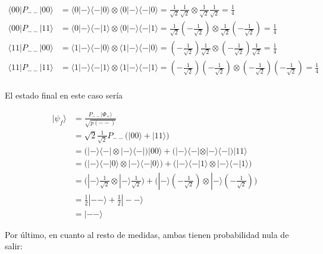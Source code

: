 \documentclass{article}
\begin{document}
\begin{align*}
  \langle 00|P_{--}|00\rangle 
    &= \langle 0|-\rangle\langle -|0\rangle
      \otimes \langle 0|-\rangle\langle -|0\rangle
    = \frac{1}{\sqrt{2}}\frac{1}{\sqrt{2}}
      \otimes \frac{1}{\sqrt{2}}\frac{1}{\sqrt{2}}
    = \frac{1}{4} \\
  \langle 00|P_{--}|11\rangle 
    &= \langle 0|-\rangle\langle -|1\rangle
      \otimes \langle 0|-\rangle\langle -|1\rangle
    = \frac{1}{\sqrt{2}}(-\frac{1}{\sqrt{2}})
      \otimes \frac{1}{\sqrt{2}}(-\frac{1}{\sqrt{2}})
    = \frac{1}{4} \\
  \langle 11|P_{--}|00\rangle 
    &= \langle 1|-\rangle\langle -|0\rangle
      \otimes \langle 1|-\rangle\langle -|0\rangle
    = (-\frac{1}{\sqrt{2}})\frac{1}{\sqrt{2}}
      \otimes (-\frac{1}{\sqrt{2}})\frac{1}{\sqrt{2}}
    = \frac{1}{4} \\
  \langle 11|P_{--}|11\rangle 
    &= \langle 1|-\rangle\langle -|1\rangle
      \otimes \langle 1|-\rangle\langle -|1\rangle
    = (-\frac{1}{\sqrt{2}})(-\frac{1}{\sqrt{2}})
      \otimes 
      (-\frac{1}{\sqrt{2}})(-\frac{1}{\sqrt{2}})
    = \frac{1}{4} \\
\end{align*}

El estado final en este caso sería

\begin{align*}
  |\psi_f\rangle &= \frac{P_{--}|\Phi_+\rangle}{\sqrt{p(--)}} \\ 
    &= \sqrt{2} \frac{1}{\sqrt{2}} 
      P_{--}\Big(|00\rangle + |11\rangle\Big) \\
    &= \Big( 
      |-\rangle\langle-|\otimes|-\rangle\langle-| 
    \Big)|00\rangle + 
    \Big( 
      |-\rangle\langle-|\otimes|-\rangle\langle-| 
    \Big)|11\rangle \\
    &= \Big(
      |-\rangle\langle -|0\rangle \otimes 
      |-\rangle\langle -|0\rangle
    \Big) + \Big(
      |-\rangle\langle -|1\rangle \otimes 
      |-\rangle\langle -|1\rangle 
    \Big)\\
    &= \Big(
      |-\rangle\frac{1}{\sqrt{2}}\otimes 
      |-\rangle\frac{1}{\sqrt{2}} 
    \Big) + \Big(
      |-\rangle(-\frac{1}{\sqrt{2}}) \otimes 
      |-\rangle(-\frac{1}{\sqrt{2}}) 
    \Big) \\
    &= \frac{1}{2}|--\rangle +
      \frac{1}{2}|--\rangle \\
    &= |--\rangle
\end{align*}

Por último, en cuanto al resto de medidas, ambas tienen 
probabilidad nula de salir:
\end{document}
